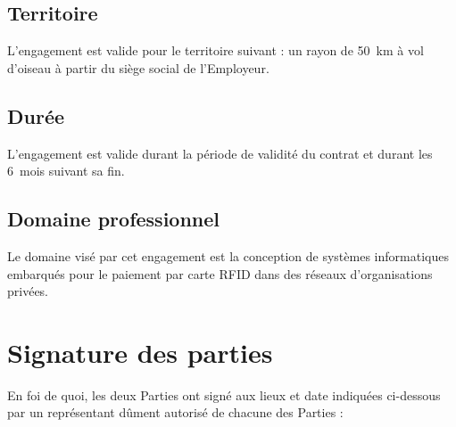 \documentclass{article}
\begin{document}
    		\subsection{Territoire}
    		L'engagement est valide pour le territoire suivant : un rayon de \SI{50}{km} à vol d'oiseau à partir du siège social de l'Employeur.
    		
    		\subsection{Durée}
    		L'engagement est valide durant la période de validité du contrat et durant les 6~mois suivant sa fin.
    		
    		\subsection{Domaine professionnel}
    		Le domaine visé par cet engagement est la conception de systèmes informatiques embarqués pour le paiement par carte RFID dans des réseaux d'organisations privées.
    	
   	\section{Signature des parties}
   	En foi de quoi, les deux Parties ont signé aux lieux et date indiquées ci-dessous par un représentant dûment autorisé de chacune des Parties : \\
    	
\end{document}
